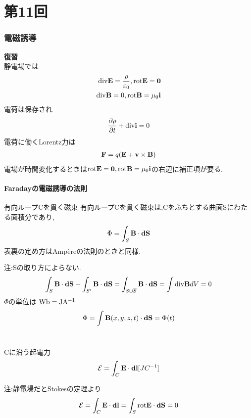 \documentclass[../main]{subfiles}
\begin{document}
\clearpage

\setcounter{eqnarray}{0}
\setcounter{equation}{0}
\setcounter{figure}{0}

\part*{第11回}

\section{電磁誘導}

{\bf 復習} \\
静電場では
\begin{eqnarray*}
{\rm div}{\bf E}=\frac{\rho}{\varepsilon_0},{\rm rot}{\bf E}={\bf 0} \\
{\rm div}{\bf B}=0,{\rm rot}{\bf B}=\mu_0{\bf i}
\end{eqnarray*}
電荷は保存され
\begin{eqnarray*}
\frac{\partial \rho}{\partial t}+{\rm div}{\bf i}=0
\end{eqnarray*}
電荷に働くLorentz力は
\begin{eqnarray*}
{\bf F}=q({\bf E}+{\bf v} \times {\bf B})
\end{eqnarray*}
電場が時間変化するときは${\rm rot}{\bf E}={\bf 0},{\rm rot}{\bf B}=\mu_0{\bf i}$の右辺に補正項が要る.

\subsection{Faradayの電磁誘導の法則}

\begin{itembox}[c]{有向ループCを貫く磁束}
有向ループCを貫く磁束は,Cをふちとする曲面Sにわたる面積分であり,
\begin{eqnarray}
\Phi = \int_{S} {\bf B} \cdot {\bf dS}
\end{eqnarray}
表裏の定め方はAmp\`ereの法則のときと同様.
\end{itembox}
注:Sの取り方によらない.
\begin{eqnarray*}
\int_{S}{\bf B}\cdot{\bf dS} -\int_{S'}{\bf B}\cdot{\bf dS} = \int_{S \cup \overline{S}} {\bf B}\cdot{\bf dS} = \int {\rm div}{\bf B} dV = 0
\end{eqnarray*}
$\Phi$の単位は ${\rm Wb = JA^{-1}}$
\begin{eqnarray*}
\Phi = \int {\bf B} (x,y,z,t) \cdot {\bf dS} = \Phi (t)
\end{eqnarray*}
\\
\begin{itembox}[c]{Cに沿う起電力}
\begin{eqnarray}
\mathcal{E} = \int_{C} {\bf E} \cdot {\bf dl} [JC^{-1}]
\end{eqnarray}
\end{itembox}
注:静電場だとStokesの定理より
\begin{eqnarray*}
\mathcal{E} = \int_{C} {\bf E} \cdot {\bf dl} = \int_{S} {\rm rot}{\bf E} \cdot {\bf dS} = 0
\end{eqnarray*}
\end{document}
